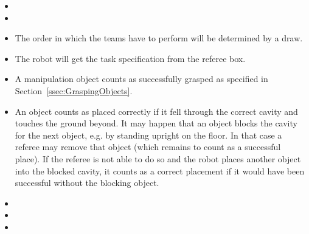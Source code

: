 \begin{itemize}

\item {}
\item {}
\item The order in which the teams have to perform will be determined by a draw.
\item The robot will get the task specification from the referee box.
\item A manipulation object counts as successfully grasped as specified in Section~\ref{ssec:GraspingObjects}.
\item An object counts as placed correctly if it fell through the correct cavity and touches the ground beyond. It may happen that an object blocks the cavity for the next object, e.g. by standing upright on the floor. In that case a referee may remove that object (which remains to count as a successful place). If the referee is not able to do so and the robot places another object into the blocked cavity, it counts as a correct placement if it would have been successful without the blocking object.
 \item {}
\item {}  
\item {}

\end{itemize}

%


